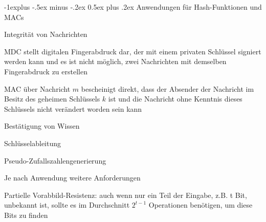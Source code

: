 \documentclass[a4paper]{article}
\makeatletter
\renewcommand{\subsection}{\@startsection{subsection}{2}{0mm}%
 {-1explus -.5ex minus -.2ex}%
 {0.5ex plus .2ex}%
 {\normalfont\normalsize\bfseries}}
\makeatother
\begin{document}
\begin{multicols}{3}
      \subsection{Anwendungen für Hash-Funktionen und MACs}
      \begin{itemize*}
            \item Integrität von Nachrichten
            \begin{itemize*}
                  \item MDC stellt digitalen Fingerabdruck dar, der mit einem privaten Schlüssel signiert werden kann und es ist nicht möglich, zwei Nachrichten mit demselben Fingerabdruck zu erstellen%
                  \item MAC über Nachricht $m$ bescheinigt direkt, dass der Absender der Nachricht im Besitz des geheimen Schlüssels $k$ ist und die Nachricht ohne Kenntnis dieses Schlüssels nicht verändert worden sein kann
            \end{itemize*}
            \item Bestätigung von Wissen
            \item Schlüsselableitung
            \item Pseudo-Zufallszahlengenerierung
            \item Je nach Anwendung weitere Anforderungen
            \begin{itemize*}
                  \item Partielle Vorabbild-Resistenz: auch wenn nur ein Teil der Eingabe, z.B. t Bit, unbekannt ist, sollte es im Durchschnitt $2^{t-1}$ Operationen benötigen, um diese Bits zu finden
            \end{itemize*}
      \end{itemize*}


\end{multicols}
\end{document}
